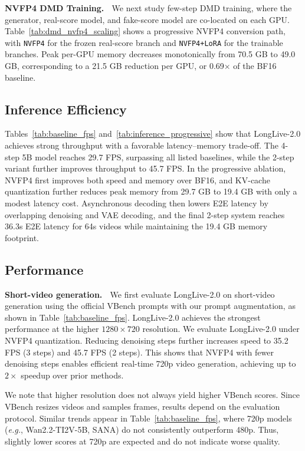 \documentclass{llmxive}
\begin{document}
\textbf{NVFP4 DMD Training.} $\;$
We next study few-step DMD training, where the generator, real-score model, and fake-score model are co-located on each GPU. Table~\ref{tab:dmd_nvfp4_scaling} shows a progressive NVFP4 conversion path, with \texttt{NVFP4} for the frozen real-score branch and \texttt{NVFP4+LoRA} for the trainable branches. Peak per-GPU memory decreases monotonically from 70.5 GB to 49.0 GB, corresponding to a 21.5 GB reduction per GPU, or 0.69$\times$ of the BF16 baseline.

\subsection{Inference Efficiency}
Tables~\ref{tab:baseline_fps} and~\ref{tab:inference_progressive}
show that LongLive-2.0 achieves strong throughput with a favorable latency--memory trade-off. The 4-step 5B model reaches 29.7 FPS, surpassing all listed baselines, while the 2-step variant further improves throughput to 45.7 FPS. In the progressive ablation, NVFP4 first improves both speed and memory over BF16, and KV-cache quantization further reduces peak memory from 29.7 GB to 19.4 GB with only a modest latency cost. Asynchronous decoding then lowers E2E latency by overlapping denoising and VAE decoding, and the final 2-step system reaches 36.3s E2E latency for 64s videos while maintaining the 19.4 GB memory footprint.


\subsection{Performance}
\textbf{Short-video generation.} $\;$
We first evaluate LongLive-2.0 on short-video generation using the official VBench prompts with our prompt augmentation, as shown in Table~\ref{tab:baseline_fps}.
LongLive-2.0 achieves the strongest performance at the higher $1280{\times}720$ resolution. 
We evaluate LongLive-2.0 under NVFP4 quantization. Reducing denoising steps further increases speed to 35.2 FPS (3 steps) and 45.7 FPS (2 steps). This shows that NVFP4 with fewer denoising steps enables efficient real-time 720p video generation, achieving up to $2{\times}$ speedup over prior methods.

We note that higher resolution does not always yield higher VBench scores. Since VBench resizes videos and samples frames, results depend on the evaluation protocol. Similar trends appear in Table~\ref{tab:baseline_fps}, where 720p models (\textit{e.g.}, Wan2.2-TI2V-5B, SANA) do not consistently outperform 480p. Thus, slightly lower scores at 720p are expected and do not indicate worse quality.
\end{document}
